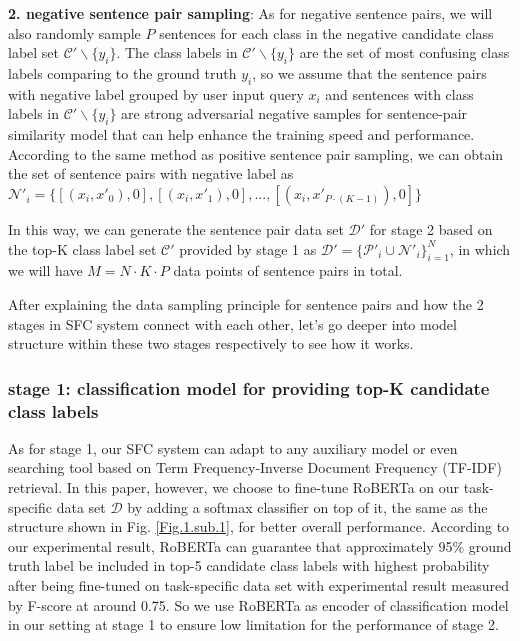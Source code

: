 \documentclass[letterpaper]{article} %
\begin{document}
  \textbf{2.  negative  sentence pair sampling}: As for negative sentence pairs,
  we  will  also  randomly  sample  $P$ sentences for each class in the negative
  candidate class label set $\mathcal{C'}\backslash \{y_{i}\}$. The class labels
  in  $\mathcal{C'}\backslash  \{y_{i}\}$  are  the  set of most confusing class
  labels comparing to the ground truth ${y_{i}}$, so we assume that the sentence
  pairs  with  negative  label grouped by user input query $x_{i}$ and sentences
  with class labels in $\mathcal{C'}\backslash \{y_{i}\}$ are strong adversarial
  negative  samples for sentence-pair similarity model that can help enhance the
  training  speed  and  performance.  According  to  the same method as positive
  sentence  pair sampling, we can obtain the set of sentence pairs with negative
  label  as $\mathcal{N'}_{i}=\{[(x_{i}, x'_{0}), 0], [(x_{i}, x'_{1}), 0], ...,
  [(x_{i}, x'_{P\cdot (K-1)}), 0]\}$

  In  this  way,  we  can generate the sentence pair data set $\mathcal{D'}$ for
  stage  2 based on the top-K class label set $\mathcal{C'}$ provided by stage 1
  as   $\mathcal{D'}=\{\mathcal{P'}_{i}\cup   \mathcal{N'}_{i}\}_{i=1}^{N}$,  in
  which we will have $M=N\cdot K\cdot P$ data points of sentence pairs in total.

  After  explaining the data sampling principle for sentence pairs and how the 2
  stages  in  SFC  system  connect  with  each other, let's go deeper into model
  structure within these two stages respectively to see how it works.

  \subsubsection*{
    stage 1: classification model for providing top-K candidate class labels
  }

  As for  stage  1,  our  SFC  system  can adapt to any auxiliary model or even
  searching  tool  based  on  Term Frequency-Inverse Document Frequency (TF-IDF)
  retrieval.  In  this  paper,  however,  we  choose to fine-tune RoBERTa on our
  task-specific  data set $\mathcal{D}$ by adding a softmax classifier on top of
  it,  the  same  as  the  structure shown in Fig. \ref{Fig.1.sub.1}, for better
  overall  performance.  According  to  our  experimental  result,  RoBERTa  can
  guarantee  that  approximately  95\%  ground  truth label be included in top-5
  candidate  class  labels  with  highest  probability after being fine-tuned on
  task-specific  data set with experimental result measured by F-score at around
  0.75.  So  we use RoBERTa as encoder of classification model in our setting at
  stage 1 to ensure low limitation for the performance of stage 2.
\end{document}
